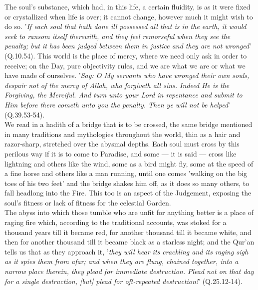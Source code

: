 \documentclass[10pt, twoside]{book}
\begin{document}
The soul's substance, which had, in this life, a certain fluidity, is as it were fixed or 
crystallized when life is over; it cannot change, however much it might wish to do so. '\emph{If each soul 
that hath done ill possessed all that is in the earth, it would seek to ransom itself therewith, and 
they feel remorseful when they see the penalty; but it has been judged between them in justice and 
they are not wronged}' (Q.10.54). This world is the place of mercy, where we need only ask in order to 
receive; on the Day, pure objectivity rules, and we are what we are or what we have made of 
ourselves. '\emph{Say: O My servants who have wronged their own souls, despair not of the mercy of Allah, 
who forgiveth all sins. Indeed He is the Forgiving, the Merciful. And turn unto your Lord in 
repentance and submit to Him before there cometh unto you the penalty. Then ye will not be 
helped}' (Q.39.53-54). \\

We read in a hadith of a bridge that is to be crossed, the same bridge mentioned in many traditions 
and mythologies throughout the world, thin as a hair and razor\hyp{}sharp, stretched over the abysmal 
depths. Each soul must cross by this perilous way if it is to come to Paradise, and some --- it is said 
--- cross like lightning and others like the wind, some as a bird might fly, some at the speed of a 
fine horse and others like a man running, until one comes 'walking on the big toes of his two feet' 
and the bridge shakes him off, as it does so many others, to fall headlong into the Fire. This too is 
an aspect of the Judgement, exposing the soul's fitness or lack of fitness for the celestial Garden. \\

The abyss into which those tumble who are unfit for anything better is a place of raging fire which, 
according to the traditional accounts, was stoked for a thousand years till it became red, for 
another thousand till it became white, and then for another thousand till it became black as a 
starless night; and the Qur'an tells us that as they approach it, '\emph{they will hear its crackling and 
its raging sigh as it spies them from afar; and when they are flung, chained together, into a narrow 
place therein, they plead for immediate destruction. Plead not on that day for a single destruction, 
[but] plead for oft\hyp{}repeated destruction!}' (Q.25.12\hyp{}14). \\
\end{document}
